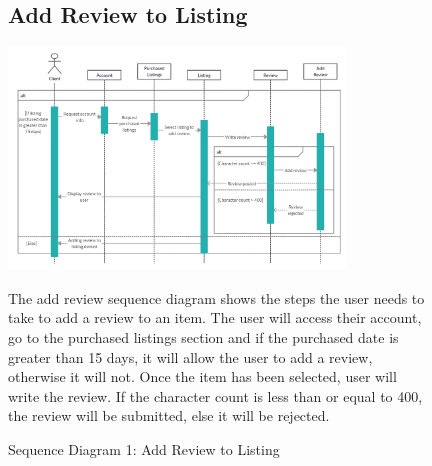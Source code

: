 \documentclass[11pt]{article}
\newcounter{use case ID}
\begin{document}
\begin{figure}[ht!]
    \subsection{Add Review to Listing}
    \centering
    \includegraphics[width=0.8\textwidth,height=0.3\paperheight]{Diagrams/Sequence/Add_Review.png} 
    \caption{Sequence Diagram 1: Add Review to Listing}
    \label{fig: Add Review to Listing}
    \begin{flushleft}
        The add review sequence diagram shows the steps the user
        needs to take to add a review to an item. The user will access their account, go to the purchased listings section and if the purchased date is greater than 15 days, it will allow the user to add a review, otherwise it will not. Once the item has been selected, user will write the review. If the character count is less than or equal to 400, the review will be submitted, else it will be rejected. 
    \end{flushleft}
\end{figure}
\end{document}

